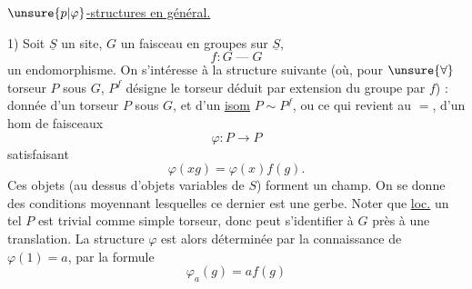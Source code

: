 \uline{$\unsure{p|\varphi}$-structures en général.}

1) Soit $\underline S$ un site, $G$ un faisceau en groupes sur $\underline S$,
\[
f:G\mathbin{\text{---}}G
\]
un endomorphisme. On s'intéresse à la structure
suivante (où, pour $\unsure{\forall}$ torseur $P$ sous $G$,
$P^f$ désigne le torseur déduit par extension du
groupe par $f$) : donnée d'un torseur $P$
sous $G$, et d'un \uline{isom} $P\sim P^f$, ou ce qui
revient au $=$, d'un hom de faisceaux
\[
\varphi:P\longrightarrow P
\]
satisfaisant
\[
\varphi(xg)=\varphi(x)f(g).
\]
Ces objets (au dessus d'objets variables de $S$)
forment un champ.
On se donne des conditions
moyennant lesquelles ce dernier est une gerbe.
Noter que \uline{loc.} un tel $P$ est trivial comme
simple torseur, donc peut s'identifier à $G$ près
à une translation. La structure $\varphi$ est alors
déterminée par la connaissance de $\varphi(1)=a$,
par la formule
\[
\varphi_a(g)=a f(g)
\]
